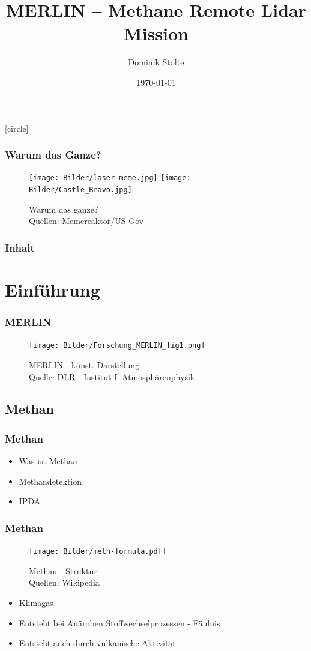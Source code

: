\documentclass{beamer}
\title{MERLIN -- Methane Remote Lidar Mission}
\author{Dominik Stolte}
\institute[{Hochschule Mannheim}]{Hochschule Mannheim}
\date{\today}
\begin{document}
 
[circle]

\begin{frame}
  \titlepage{}
\end{frame}

\begin{frame}
  \frametitle{Warum das Ganze?}
  \begin{figure}[t]
    \centering
    \texttt{[image: Bilder/laser-meme.jpg]}
    \texttt{[image: Bilder/Castle\_Bravo.jpg]}
    \caption{Warum das ganze?\\ 
    Quellen: Memereaktor/US Gov}\label{fig:WHY}
  \end{figure}
\end{frame}

\begin{frame}
  \frametitle{Inhalt}
  \tableofcontents
\end{frame}

\section{Einführung}
\begin{frame}
  \frametitle{MERLIN}    
  \begin{figure}[t]
    \centering
    \texttt{[image: Bilder/Forschung\_MERLIN\_fig1.png]}
    \caption{MERLIN - künst. Darstellung\\ 
    Quelle: DLR - Institut f. Atmosphärenphysik}\label{fig:MERLIN}
  \end{figure}
\end{frame}

\subsection{Methan}
\begin{frame}
  \frametitle{Methan}
  \begin{itemize}
    \item Was ist Methan
    \item Methandetektion
    \item IPDA
  \end{itemize}
\end{frame}

\begin{frame}
  \frametitle{Methan}
  \begin{figure}[t]
    \centering
    \texttt{[image: Bilder/meth-formula.pdf]}
    \caption{Methan - Struktur\\ 
    Quellen: Wikipedia}\label{fig:METH}
  \end{figure}
  \begin{itemize}
    \item Klimagas
    \item Entsteht bei Anäroben Stoffwechselprozessen - Fäulnis
    \item Entsteht auch durch vulkanische Aktivität
  \end{itemize}
\end{frame}
\end{document}
